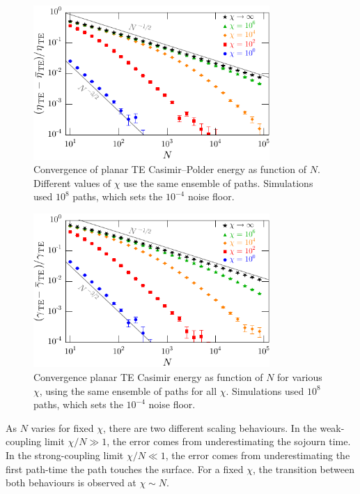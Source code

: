 \begin{figure}
  \centering
  \includegraphics[width=0.8\textwidth]{fig/temp/conv_TEatomN3}
  \caption[Convergence of planar TE Casimir--Polder energy  as function of $N$.  ]{
    Convergence of planar TE Casimir--Polder energy as function of $N$.  
    Different values of $\chi$ use the same ensemble of paths.
    Simulations used $10^8$ paths, which sets the $10^{-4}$ noise floor.}
  \label{fig:conv_atom}
\end{figure}

\begin{figure}
  \centering
  \includegraphics[width=0.8\textwidth]{fig/temp/conv_TE2wallN3}
  \caption[Convergence planar TE Casimir energy as function of $N$ for various $\chi$.]{
    Convergence planar TE Casimir energy as function of $N$ for various $\chi$, using the same ensemble of paths for all $\chi$.
    Simulations used $10^8$ paths, which sets the $10^{-4}$ noise floor.}
  \label{fig:conv_wall}
\end{figure}

As $N$ varies for fixed $\chi$, there are two different scaling behaviours.  
In the weak-coupling limit $\chi/N\gg 1$, the error comes from underestimating the sojourn time.
In the strong-coupling limit $\chi/N\ll 1$, the error comes from underestimating the first path-time
the path touches the surface.
For a fixed $\chi$, the transition between both behaviours is observed at $\chi\sim N$. 

